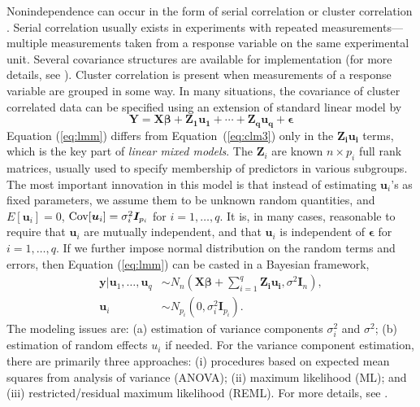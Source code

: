 		Nonindependence can occur in the form of serial correlation or cluster correlation \citep[chapter~17]{rencher2008linear}. Serial correlation usually exists in experiments with repeated measurements---multiple measurements taken from a response variable on the same experimental unit. Several covariance structures are available for implementation (for more details, see \citealt[chapter~5]{littell2006sas}).  Cluster correlation is present when measurements of a response variable are grouped in some way. In many situations, the covariance of cluster correlated data can be specified using an extension of standard linear model by 
		\begin{equation}\label{eq:lmm}
		\bm Y = \bm {X\beta} + \bm {Z_1u_1}+\cdots + \bm {Z_qu_q} + \bm \epsilon	
		\end{equation}
		Equation (\ref{eq:lmm}) differs from Equation~(\ref{eq:clm3}) only in the $\bm {Z_iu_i}$ terms, which is the key part of \textit{linear mixed models}.  The $\bm Z_i$  are known $n\times p_i$ full rank matrices, usually used to specify membership of predictors in various subgroups. The most important innovation in this model is that instead of estimating $\bm u_i$'s as fixed parameters, we assume them to be unknown random quantities, and $E[\bm u_i]=0$, $\text{Cov}[\bm u_i]= \sigma_i^2 \bm I_{p_i}$ for $i=1, \ldots, q$. It is, in many cases, reasonable to require that $\bm u_i$ are mutually independent, and that $\bm u_i$ is independent of $\bm \epsilon$ for $i=1, \ldots, q$. If we further impose normal distribution on the random terms and errors, then Equation (\ref{eq:lmm}) can be casted in a Bayesian framework,
		\begin{equation}\label{eq:lmmGuass}
		\begin{split}
		\bm y|\bm u_1, \ldots, \bm u_q   & \sim  N_n(\bm {X\beta} + \sum_{i=1}^q \bm {Z_iu_i}, \sigma^2\bm I_n),  \\
		\bm u_i &\sim N_{p_i}(0, \sigma_i^2 \bm I_{p_i}).
		\end{split}
		\end{equation}
		The modeling issues are: (a) estimation of variance components $\sigma_i^2$ and $\sigma^2$; (b) estimation of random effects $u_i$ if needed. For the variance component estimation, there are primarily three approaches: (i) procedures based on expected mean squares from analysis of variance (ANOVA); (ii) maximum likelihood (ML); and (iii) restricted/residual maximum likelihood (REML). For more details, see \citealt[Chapter 1]{littell2006sas}.
		
